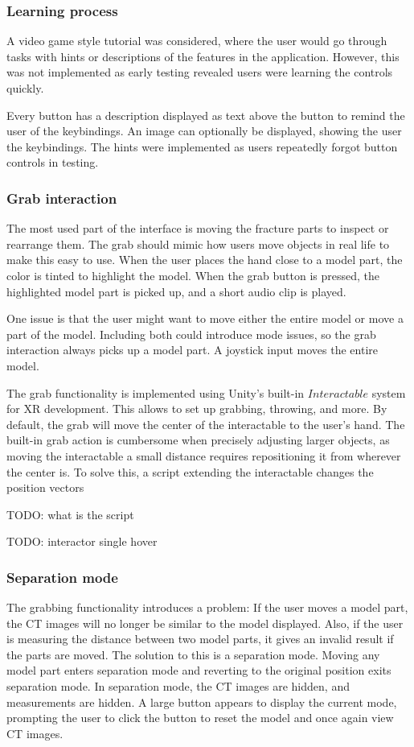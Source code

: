 \documentclass[a4paper]{report}
\begin{document}
\subsubsection{Learning process}
A video game style tutorial was considered, where the user would go through tasks with hints or descriptions of the features in the application. However, this was not implemented as early testing revealed users were learning the controls quickly.

Every button has a description displayed as text above the button to remind the user of the keybindings. An image can optionally be displayed, showing the user the keybindings. The hints were implemented as users repeatedly forgot button controls in testing.

\subsubsection{Grab interaction}

The most used part of the interface is moving the fracture parts to inspect or rearrange them. The grab should mimic how users move objects in real life to make this easy to use. When the user places the hand close to a model part, the color is tinted to highlight the model. When the grab button is pressed, the highlighted model part is picked up, and a short audio clip is played. 


One issue is that the user might want to move either the entire model or move a part of the model. Including both could introduce mode issues\cite{nngroup}, so the grab interaction always picks up a model part. A joystick input moves the entire model.

The grab functionality is implemented using Unity's built-in $Interactable$ system for XR\cite{noauthor_xr_nodate} development. This allows to set up grabbing, throwing, and more. 
By default, the grab will move the center of the interactable to the user's hand. The built-in grab action is cumbersome when precisely adjusting larger objects, as moving the interactable a small distance requires repositioning it from wherever the center is. To solve this, a script extending the interactable changes the position vectors 

TODO: what is the script

TODO: interactor single hover


\subsubsection{Separation mode}
The grabbing functionality introduces a problem: If the user moves a model part, the CT images will no longer be similar to the model displayed. Also, if the user is measuring the distance between two model parts, it gives an invalid result if the parts are moved. 
The solution to this is a separation mode. Moving any model part enters separation mode and reverting to the original position exits separation mode. In separation mode, the CT images are hidden, and measurements are hidden. A large button appears to display the current mode, prompting the user to click the button to reset the model and once again view CT images.
\end{document}

